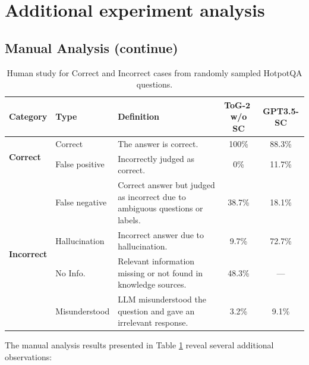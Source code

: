 \documentclass{article} %
\begin{document}
\section{Additional experiment analysis}
\subsection{Manual Analysis (continue)}
\label{apd_manual}
\begin{table}[ht]
\centering
\begin{tabular}{llp{}c c}  
\toprule
\textbf{Category}   & \textbf{Type}                           & \textbf{Definition}                             & \textbf{ToG-$\textbf{2 }$\-w/o SC} & \textbf{GPT3.5-SC} \\
\midrule
\multirow{2}{*}{\textbf{Correct}}   
& Correct                     & The answer is correct.                        & 100\%                     & 88.3\%                   \\
\cmidrule(lr){2-5}
& False positive               & Incorrectly judged as correct.                & 0\%                       & 11.7\%                   \\
\midrule
\multirow{4}{*}{\textbf{Incorrect}}  
& False negative             & Correct answer but judged as incorrect due to ambiguous questions or labels. & 38.7\%          & 18.1\%                   \\
\cmidrule(lr){2-5}
& Hallucination               & Incorrect answer due to hallucination. & 9.7\%            & 72.7\%                   \\
\cmidrule(lr){2-5}
& No Info.                    & Relevant information missing or not found in knowledge sources. & 48.3\%         & —                        \\
\cmidrule(lr){2-5}
& Misunderstood               & LLM misunderstood the question and gave an irrelevant response.  & 3.2\%           & 9.1\%                    \\
\bottomrule
\end{tabular}
\caption{Human study for Correct and Incorrect cases from randomly sampled HotpotQA questions.}
\label{case-statis}
\end{table}
The manual analysis results presented in Table \ref{case-statis} reveal several additional observations:

\end{document}
